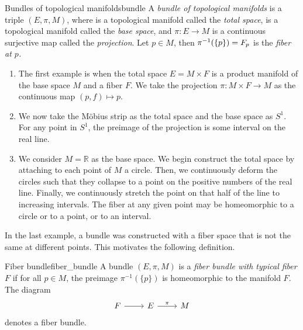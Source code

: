 \begin{definition}{Bundles of topological manifolds}{bundle}
    A \emph{bundle of topological manifolds} is a triple \((E, \pi, M)\), where  is a topological manifold called the \emph{total space},  is a topological manifold called the \emph{base space}, and \(\pi : E \to M\) is a continuous surjective map called the \emph{projection}. Let \(p \in M\), then \(\pi^{-1}(\{p\}) = F_p\) is the \emph{fiber at \(p\).}
\end{definition}
\begin{example}
    \begin{enumerate}[label=(\alph*)]
        \item The first example is when the total space \(E = M \times F\) is a product manifold of the base space \(M\) and a fiber \(F\). We take the projection \(\pi : M \times F \to M\) as the continuous map \((p, f) \mapsto p\).
        \item We now take the Möbius strip as the total space and the base space as \(S^1\). For any point in \(S^1\), the preimage of the projection is some interval on the real line.  %
        \item We consider \(M = \mathbb{R}\) as the base space. We begin construct the total space by attaching to each point of \(M\) a circle. Then, we continuously deform the circles such that they collapse to a point on the positive numbers of the real line. Finally, we continuously stretch the point on that half of the line to increasing intervals. The fiber at any given point may be homeomorphic to a circle or to a point, or to an interval.
    \end{enumerate}
\end{example}

In the last example, a bundle was constructed with a fiber space that is not the same at different points. This motivates the following definition.

\begin{definition}{Fiber bundle}{fiber_bundle}
    A bundle \((E, \pi, M)\) is a \emph{fiber bundle with typical fiber \(F\)} if for all \(p \in M\), the preimage \(\pi^{-1}(\{p\})\) is homeomorphic to the manifold \(F\). The diagram
    \begin{equation*}
        \begin{tikzcd}[row sep = large, column sep = normal]
            F \arrow{r}{} & E \arrow{r}{\pi} & M
        \end{tikzcd}
    \end{equation*}
    denotes a fiber bundle.
\end{definition}

